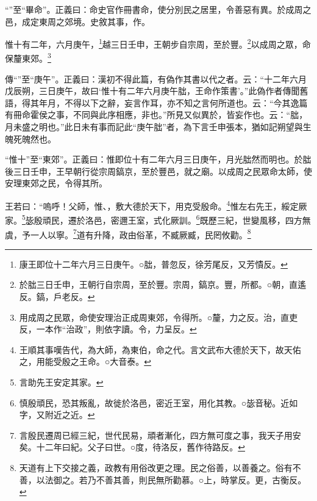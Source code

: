 {\noindent\shu{}\fzkt “”至“畢命”。正義曰：命史官作冊書命，使分別民之居里，令善惡有異。於成周之邑，成定東周之郊境。史敘其事，作。 \par}

惟十有二年，六月庚午，\footnote{康王即位十二年六月三日庚午。○朏，普忽反，徐芳尾反，又芳憒反。}越三日壬申，王朝步自宗周，至於豐。\footnote{於朏三日壬申，王朝行自宗周，至於豐。宗周，鎬京。豐，所都。○朝，直遙反。鎬，戶老反。}以成周之眾，命保釐東郊。\footnote{用成周之民眾，命使安理治正成周東郊，令得所。○釐，力之反。治，直吏反，一本作“治政”，則依字讀。令，力呈反。}


{\noindent\zhuan{}\fzbyks 傳“”至“庚午”。正義曰：漢初不得此篇，有偽作其書以代之者。云：“十二年六月戊辰朔，三日庚午，故曰‘惟十有二年六月庚午朏，王命作策書’。”此偽作者傳聞舊語，得其年月，不得以下之辭，妄言作耳，亦不知之言何所道也。云：“今其逸篇有冊命霍侯之事，不同與此序相應，非也。”所見又似異於，皆妄作也。云：“朏，月未盛之明也。”此日未有事而記此“庚午朏”者，為下言壬申張本，猶如記朔望與生魄死魄然也。 \par}

{\noindent\shu{}\fzkt “惟十”至“東郊”。正義曰：惟即位十有二年六月三日庚午，月光朏然而明也。於朏後三日壬申，王早朝行從宗周鎬京，至於豐邑，就之廟。以成周之民眾命太師，使安理東郊之民，令得其所。 \par}

王若曰：“嗚呼！父師，惟、，敷大德於天下，用克受殷命。\footnote{王順其事嘆告代，為大師，為東伯，命之代。言文武布大德於天下，故天佑之，用能受殷之王命。○大音泰。}惟左右先王，綏定厥家。\footnote{言助先王安定其家。}毖殷頑民，遷於洛邑，密邇王室，式化厥訓。\footnote{慎殷頑民，恐其叛亂，故徙於洛邑，密近王室，用化其教。○毖音秘。近如字，又附近之近。}既歷三紀，世變風移，四方無虞，予一人以寧。\footnote{言殷民遷周已經三紀，世代民易，頑者漸化，四方無可度之事，我天子用安矣。十二年曰紀。父子曰世。○度，待洛反，舊作待路反。}道有升降，政由俗革，不臧厥臧，民罔攸勸。\footnote{天道有上下交接之義，政教有用俗改更之理。民之俗善，以善養之。俗有不善，以法御之。若乃不善其善，則民無所勸慕。○上，時掌反。更，古衡反。}


